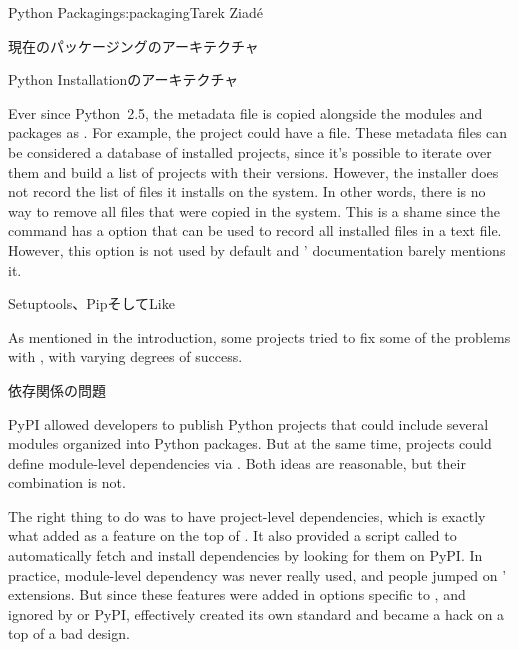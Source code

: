 \begin{aosachapter}{Python Packaging}{s:packaging}{Tarek Ziad\'{e}}
\begin{aosasect1}{現在のパッケージングのアーキテクチャ}
\begin{aosasect2}{Python Installationのアーキテクチャ}
\begin{aosaitemize}
\end{aosaitemize}

Ever since Python~2.5, the metadata file is copied alongside the modules
and packages as . For example, the
 project could have a
 file.  These metadata files can be
considered a database of installed projects, since it's possible to
iterate over them and build a list of projects with their versions.
However, the  installer does not record the list of
files it installs on the system.  In other words, there is no way to
remove all files that were copied in the system.  This is a shame
since the  command has a  option that can
be used to record all installed files in a text file. However, this
option is not used by default and ' documentation
barely mentions it.

\end{aosasect2}

\begin{aosasect2}{Setuptools、PipそしてLike}

As mentioned in the introduction, some projects tried to fix some of
the problems with , with varying degrees of success.

\begin{aosasect3}{依存関係の問題}

PyPI allowed developers to publish Python projects that could include
several modules organized into Python packages. But at the same time,
projects could define module-level dependencies via .
Both ideas are reasonable, but their combination is not.

The right thing to do was to have project-level dependencies, which is
exactly what  added as a feature on the top of
.  It also provided a script called
 to automatically fetch and install dependencies
by looking for them on PyPI\@.  In practice, module-level dependency was
never really used, and people jumped on ' extensions.
But since these features were added in options specific to
, and ignored by  or PyPI,
 effectively created its own standard and became a
hack on a top of a bad design.


\end{aosasect3}
\end{aosasect2}
\end{aosasect1}
\end{aosachapter}
